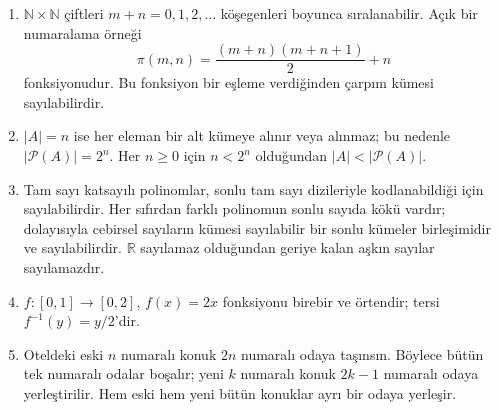 \begin{enumerate}
\item $\mathbb N\times\mathbb N$ çiftleri $m+n=0,1,2,\ldots$ köşegenleri boyunca sıralanabilir. Açık bir numaralama örneği
\[
\pi(m,n)=\frac{(m+n)(m+n+1)}{2}+n
\]
fonksiyonudur. Bu fonksiyon bir eşleme verdiğinden çarpım kümesi sayılabilirdir.

\item $|A|=n$ ise her eleman bir alt kümeye alınır veya alınmaz; bu nedenle $|\mathcal P(A)|=2^n$. Her $n\geq0$ için $n<2^n$ olduğundan $|A|<|\mathcal P(A)|$.

\item Tam sayı katsayılı polinomlar, sonlu tam sayı dizileriyle kodlanabildiği için sayılabilirdir. Her sıfırdan farklı polinomun sonlu sayıda kökü vardır; dolayısıyla cebirsel sayıların kümesi sayılabilir bir sonlu kümeler birleşimidir ve sayılabilirdir. $\mathbb R$ sayılamaz olduğundan geriye kalan aşkın sayılar sayılamazdır.

\item $f:[0,1]\to[0,2]$, $f(x)=2x$ fonksiyonu birebir ve örtendir; tersi $f^{-1}(y)=y/2$'dir.

\item Oteldeki eski $n$ numaralı konuk $2n$ numaralı odaya taşınsın. Böylece bütün tek numaralı odalar boşalır; yeni $k$ numaralı konuk $2k-1$ numaralı odaya yerleştirilir. Hem eski hem yeni bütün konuklar ayrı bir odaya yerleşir.
\end{enumerate}
